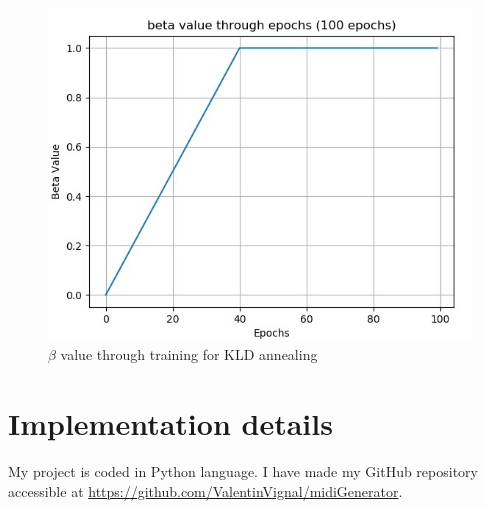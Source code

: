 \documentclass[12pt]{report}
\begin{document}
\begin{figure}[htbp]
    \centering
    \includegraphics[width=0.8 \textwidth]{images/nn/training/beta-annealing.jpg}
    \caption{$\beta$ value through training for KLD annealing}
    \label{fig:beta-annealing}
\end{figure}

\section{Implementation details}

My project is coded in Python language.
I have made my GitHub repository accessible at \url{https://github.com/ValentinVignal/midiGenerator}. 
\end{document}
